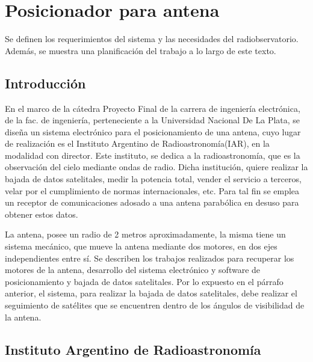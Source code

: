 \renewcommand{\chaptername}{Requerimientos para estación terrena}
\chapter{Posicionador para antena }
\begin{center}
\begin{tcolorbox}[colback=gray!5!white, %
colframe=gray!75!black,
title= \center{\Large{Resumen}} ]

Se definen los requerimientos del sistema y las necesidades del radiobservatorio. Además, se muestra una planificación del trabajo a lo largo de este texto. 
\end{tcolorbox}
\end{center}    
\section{Introducción}  %
En el marco de la cátedra Proyecto Final de la carrera de ingeniería electrónica, de la fac. de ingeniería, perteneciente a la Universidad Nacional De La Plata, se diseña un sistema electrónico para el  posicionamiento de una antena, cuyo lugar de realización es el Instituto Argentino de Radioastronomía(IAR), en la modalidad con director. Este instituto, se dedica a la radioastronomía, que es la observación del cielo mediante ondas de radio. Dicha institución, quiere realizar la bajada de datos satelitales, medir la potencia total, vender el servicio a terceros, velar por el cumplimiento de normas internacionales, etc. Para tal fin se emplea un receptor de comunicaciones adosado a una antena parabólica en desuso para obtener estos datos.

La antena, posee un radio de 2 metros aproximadamente, la misma tiene un sistema mecánico, que mueve la antena mediante dos motores, en dos ejes independientes entre sí. Se describen los trabajos realizados para recuperar los motores de la antena, desarrollo del sistema electrónico y software de posicionamiento y bajada de datos satelitales. Por lo expuesto en el párrafo anterior, el sistema, para realizar la bajada de datos satelitales, debe realizar el seguimiento de satélites que se encuentren dentro de los ángulos de visibilidad de la antena.

\section{Instituto Argentino de Radioastronomía} 

